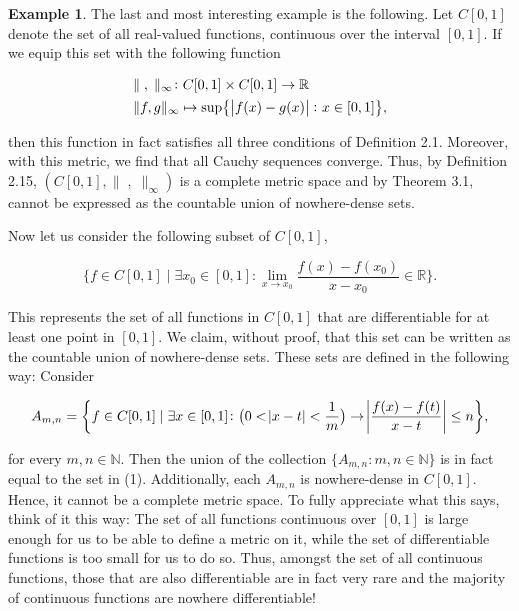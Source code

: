 \documentclass{article}
\theoremstyle{definition}
\theoremstyle{remark}
\theoremstyle{definition}
\newtheorem{example}{Example}[section]
\begin{document}
\begin{example}
    The last and most interesting example is the following. Let $C[0,1]$ denote the set of all real-valued functions, continuous over the interval $[0,1]$. If we equip this set with the following function
    
    \begin{equation*}
        \begin{split}
            &\|\;,\;\|_{\infty}\colon C[0,1]\times C[0,1]\rightarrow\mathbb{R} \\
            &\|f,g\|_{\infty}\mapsto\text{sup}\big\{\abs{f(x)-g(x)}\colon x\in[0,1]\big\},
        \end{split}
    \end{equation*}
    
    \noindent then this function in fact satisfies all three conditions of Definition 2.1. Moreover, with this metric, we find that all Cauchy sequences converge. Thus, by Definition 2.15, $(C[0,1],\|\;,\;\|_{\infty}) $ is a complete metric space and by Theorem 3.1, cannot be expressed as the countable union of nowhere-dense sets.\par 
        Now let us consider the following subset of $C[0,1]$, 
        
        \begin{equation}
            \bigg\{f\in C[0,1]\mid\exists x_0\in[0,1]\colon \lim_{x\rightarrow x_0} \frac{f(x)-f(x_0)}{x-x_0}\in\mathbb{R}\bigg\}.
        \end{equation}
        
    \noindent This represents the set of all functions in $C[0,1]$ that are differentiable for at least one point in $[0,1]$. We claim, without proof, that this set can be written as the countable union of nowhere-dense sets. These sets are defined in the following way: Consider
    
    \begin{equation*}
        A_{m,n}=\bigg\{f\in C[0,1]\mid \exists x\in[0,1]\colon \big(0<\abs{x-t}<\frac{1}{m}\big)\rightarrow\abs{\frac{f(x)-f(t)}{x-t}}\leq n\bigg\},
    \end{equation*}
    
    for every $m,n\in\mathbb{N}$. Then the union of the collection $\{A_{m,n}\colon m,n\in\mathbb{N}\}$ is in fact equal to the set in (1). Additionally, each $A_{m,n}$ is nowhere-dense in $C[0,1]$. Hence, it cannot be a complete metric space. To fully appreciate what this says, think of it this way: The set of all functions continuous over $[0,1]$ is large enough for us to be able to define a metric on it, while the set of differentiable functions is too small for us to do so. Thus, amongst the set of all continuous functions, those that are also differentiable are in fact very rare and the majority of continuous functions are nowhere differentiable!
\end{example}
\end{document}
